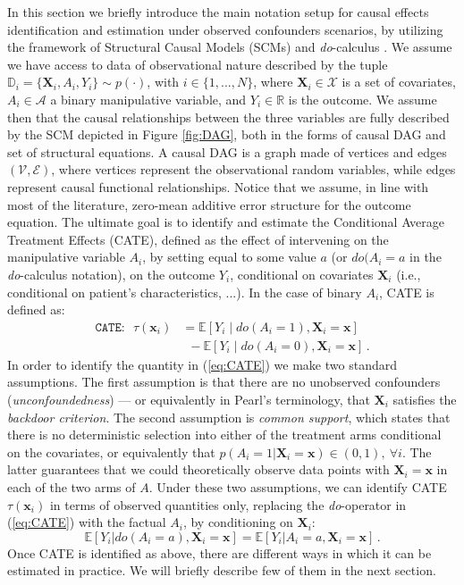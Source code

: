 \documentclass[nohyperref]{article}
\theoremstyle{plain}
\theoremstyle{definition}
\theoremstyle{remark}
\begin{document}
In this section we briefly introduce the main notation setup for causal effects identification and estimation under observed confounders scenarios, by utilizing the framework of Structural Causal Models (SCMs) and \emph{do}-calculus \citep{pearl_2009}. We assume we have access to data of observational nature described by the tuple $\mathbb{D}_i = \{\bm{X}_i, A_i, Y_i \} \sim p(\cdot)$, with $i \in \{1, ..., N\}$, where $\bm{X}_i \in \mathcal{X}$ is a set of covariates, $A_i \in \mathcal{A}$ a binary manipulative variable, and $Y_i \in \mathbb{R}$ is the outcome. We assume then that the causal relationships between the three variables are fully described by the SCM depicted in Figure \ref{fig:DAG}, both in the forms of causal DAG and set of structural equations. A causal DAG is a graph made of vertices and edges $(\mathcal{V}, \mathcal{E})$, where vertices represent the observational random variables, while edges represent causal functional relationships. Notice that we assume, in line with most of the literature, zero-mean additive error structure for the outcome equation. The ultimate goal is to identify and estimate the Conditional Average Treatment Effects (CATE), defined as the effect of intervening on the manipulative variable $A_i$, by setting equal to some value $a$ (or $do(A_i = a$ in the \emph{do}-calculus notation), on the outcome $Y_i$, conditional on covariates $\bm{X}_i$ (i.e., conditional on patient's characteristics, ...). In the case of binary $A_i$, CATE is defined as:
\begin{align} 
\texttt{CATE:} \,\,\,\, \tau(\bm{x}_i) & = \mathbb{E} [ Y_i \mid do(A_i = 1), \bm{X}_i = \bm{x} ]  \nonumber \\ & \,\,\, - \mathbb{E} [ Y_i \mid do(A_i = 0), \bm{X}_i = \bm{x} ] \, . \label{eq:CATE}
\end{align}
In order to identify the quantity in (\ref{eq:CATE}) we make two standard assumptions. The first assumption is that there are no unobserved confounders (\emph{unconfoundedness}) --- or equivalently in Pearl's terminology, that $\bm{X}_i$ satisfies the \emph{backdoor criterion}. The second assumption is \emph{common support}, which states that there is no deterministic selection into either of the treatment arms conditional on the covariates, or equivalently that $p(A_i = 1 | \bm{X}_i = \bm{x}) \in (0,1),~\forall i$. The latter guarantees that we could theoretically observe data points with $\bm{X}_i=\bm{x}$ in each of the two arms of $A$. Under these two assumptions, we can identify CATE $\tau(\bm{x}_i)$ in terms of observed quantities only, replacing the \emph{do}-operator in (\ref{eq:CATE}) with the factual $A_i$, by conditioning on $\bm{X}_i$:
\begin{equation*}
\mathbb{E} [ Y_i | do(A_i = a), \bm{X}_i = \bm{x} ] = \mathbb{E} [ Y_i | A_i = a, \bm{X}_i = \bm{x} ] \, .
\end{equation*}
Once CATE is identified as above, there are different ways in which it can be estimated in practice. We will briefly describe few of them in the next section.
\end{document}
